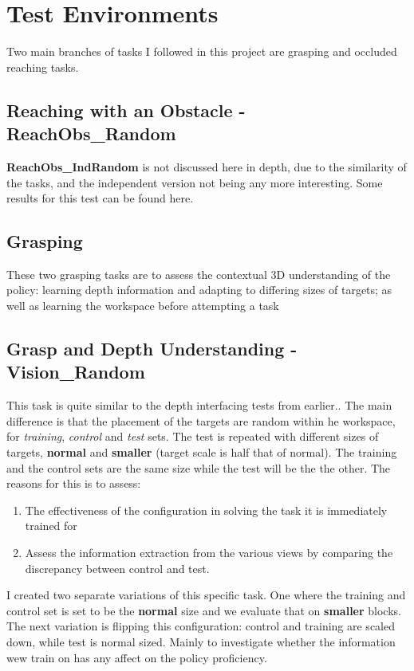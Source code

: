 \section{Test Environments}
Two main branches of tasks I followed in this project are grasping and occluded reaching tasks.

\subsection{Reaching with an Obstacle - \textbf{ReachObs\_Random}}

\textbf{ReachObs\_IndRandom} is not discussed here in depth, due to the similarity of the tasks, and the independent version not being any more interesting. Some results for this test can be found here.

\subsection{Grasping}
These two grasping tasks are to assess the contextual 3D understanding of the policy: learning depth information and adapting to differing sizes of targets; as well as learning the workspace before attempting a task 

\subsection{Grasp and Depth Understanding - \textbf{Vision\_Random}}
This task is quite similar to the depth interfacing tests from earlier.. The main difference is that the placement of the targets are random within he workspace, for \emph{training}, \emph{control} and \emph{test} sets. The test is repeated with different sizes of targets, \textbf{normal} and \textbf{smaller} (target scale is half that of normal). The training and the control sets are the same size while the test will be the the other. The reasons for this is to assess:
\begin{enumerate}
  \item The effectiveness of the configuration in solving the task it is immediately trained for
  \item Assess the information extraction from the various views by comparing the discrepancy between control and test.
\end{enumerate}
I created two separate variations of this specific task. One where the training and control set is set to be the \textbf{normal} size and we evaluate that on \textbf{smaller} blocks. The next variation is flipping this configuration: control and training are scaled down, while test is normal sized. Mainly to investigate whether the information wew train on has any affect on the policy proficiency.

